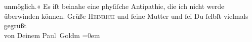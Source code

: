 \begin{ledgroupsized}[t]{13cm}
               unmöglich.« Es iſt beinahe eine phyſiſche Antipathie, die ich nicht werde überwinden
               können.\pend
           \pstart
           Grüße \textsc{Heinrich} und ſeine Mutter und
               ſei Du ſelbſt vielmals gegrüßt {\\[\baselineskip]}von Deinem \spacefill\mbox{Paul Goldm}\pend
           \leftskip=0em{}
         
         \endnumbering{}\end{ledgroupsized}  \newcommand{\dateiname}{L03230}\newcommand{\titel}{Paul Goldmann an Arthur Schnitzler, 24. 11. [1902]}\newcommand{\editorInnen}{Martin Anton Müller und Laura Untner}
      